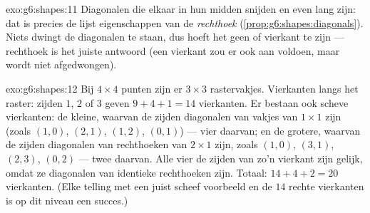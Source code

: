 \begin{solution}{exo:g6:shapes:11}
Diagonalen die elkaar in hun midden snijden en even lang zijn: dat is precies de
lijst eigenschappen van de \emph{rechthoek}
(\cref{prop:g6:shapes:diagonals}). Niets dwingt de diagonalen  te
staan, dus hoeft het geen  of vierkant te zijn --- rechthoek is het juiste
antwoord (een vierkant zou er ook aan voldoen, maar wordt niet afgedwongen).
\end{solution}

\begin{solution}{exo:g6:shapes:12}
Bij $4 \times 4$ punten zijn er $3 \times 3$ rastervakjes. Vierkanten langs het
raster: zijden $1$, $2$ of $3$ geven $9 + 4 + 1 = 14$ vierkanten. Er bestaan ook
scheve vierkanten: de kleine, waarvan de zijden diagonalen van vakjes van
$1 \times 1$ zijn (zoals $(1,0)$, $(2,1)$, $(1,2)$, $(0,1)$) --- vier daarvan;
en de grotere, waarvan de zijden diagonalen van rechthoeken van $2 \times 1$
zijn, zoals $(1,0)$, $(3,1)$, $(2,3)$, $(0,2)$ --- twee daarvan. Alle vier de
zijden van zo'n vierkant zijn gelijk, omdat ze diagonalen van identieke
rechthoeken zijn. Totaal: $14 + 4 + 2 = 20$ vierkanten. (Elke telling met een
juist scheef voorbeeld en de $14$ rechte vierkanten is op dit niveau een
succes.)
\end{solution}

